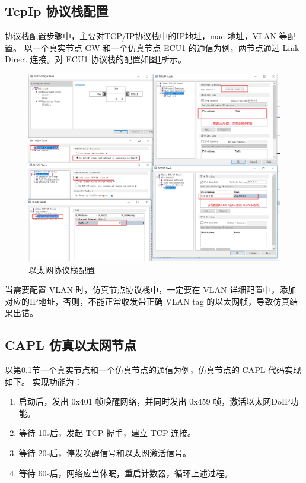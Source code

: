\subsection{TcpIp 协议栈配置}\label{sec:two_node_comm}
协议栈配置步骤中，主要对TCP/IP协议栈中的IP地址，mac 地址，VLAN 等配置。
以一个真实节点 GW 和一个仿真节点 ECU1 的通信为例，两节点通过 Link Direct 连接。对 ECU1 协议栈的配置如图\ref{fig:tcpip_Configuration}所示。

\begin{figure}[!ht]
    \centering
    \includegraphics[scale=0.5]{pic/Snipaste_2021-10-29_16-08-23.png}
    \caption{以太网协议栈配置}
    \label{fig:tcpip_Configuration}
\end{figure}

\begin{note}
    当需要配置 VLAN 时，仿真节点协议栈中，一定要在 VLAN 详细配置中，添加对应的IP地址，否则，不能正常收发带正确 VLAN tag 的以太网帧，导致仿真结果出错。
\end{note}

\subsection{CAPL 仿真以太网节点}
以第\ref{sec:two_node_comm}节一个真实节点和一个仿真节点的通信为例，仿真节点的 CAPL 代码实现如下。
实现功能为：

\begin{enumerate}
    \item 启动后，发出 0x401 帧唤醒网络，并同时发出 0x459 帧，激活以太网DoIP功能。
    \item 等待 10s后，发起 TCP 握手，建立 TCP 连接。
    \item 等待 20s后，停发唤醒信号和以太网激活信号。
    \item 等待 60s后，网络应当休眠，重启计数器，循环上述过程。
\end{enumerate}


